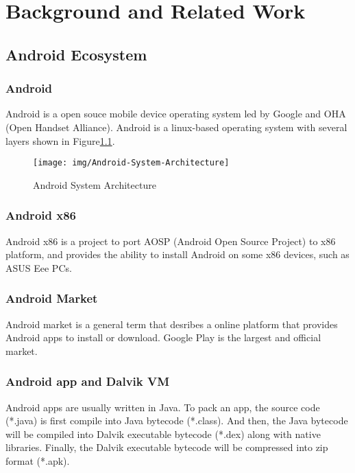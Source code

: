 \chapter{Background and Related Work}

\section{Android Ecosystem}

\subsection{Android}

Android is a open souce mobile device operating system led by Google and
OHA (Open Handset Alliance). Android is a linux-based operating system with
several layers shown in Figure\ref{fig:android-system-architecture}.

\begin{figure}[!ht]
\texttt{[image: img/Android-System-Architecture]}
\caption{Android System Architecture}
\label{fig:android-system-architecture}
\end{figure}

\subsection{Android x86}

Android x86 is a project to port AOSP (Android Open Source Project) to x86
platform, and provides the ability to install Android on some x86 devices, such
as ASUS Eee PCs.

\subsection{Android Market}

Android market is a general term that desribes a online platform that provides
Android apps to install or download. Google Play is the largest and official
market.

\subsection{Android app and Dalvik VM}

Android apps are usually written in Java. To pack an app, the
source code (*.java) is first compile into Java bytecode (*.class). And then,
the Java bytecode will be compiled into Dalvik executable bytecode (*.dex)
along with native libraries. Finally, the Dalvik executable bytecode will be
compressed into zip format (*.apk).

